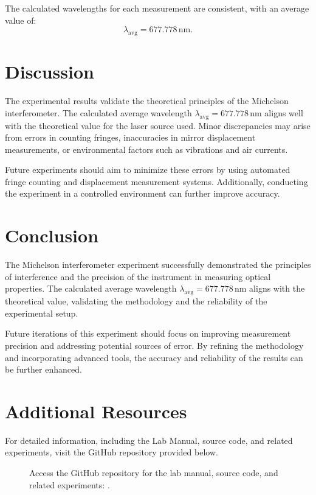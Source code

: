 \documentclass[journal]{IEEEtran}
\begin{document}
The calculated wavelengths for each measurement are consistent, with an average value of:
\begin{equation}
\lambda_{\text{avg}} = 677.778 \, \text{nm}.
\end{equation}

\section{Discussion}
The experimental results validate the theoretical principles of the Michelson interferometer. The calculated average wavelength \( \lambda_{\text{avg}} = 677.778 \, \text{nm} \) aligns well with the theoretical value for the laser source used. Minor discrepancies may arise from errors in counting fringes, inaccuracies in mirror displacement measurements, or environmental factors such as vibrations and air currents.

Future experiments should aim to minimize these errors by using automated fringe counting and displacement measurement systems. Additionally, conducting the experiment in a controlled environment can further improve accuracy.

\section{Conclusion}
The Michelson interferometer experiment successfully demonstrated the principles of interference and the precision of the instrument in measuring optical properties. The calculated average wavelength \( \lambda_{\text{avg}} = 677.778 \, \text{nm} \) aligns with the theoretical value, validating the methodology and the reliability of the experimental setup.

Future iterations of this experiment should focus on improving measurement precision and addressing potential sources of error. By refining the methodology and incorporating advanced tools, the accuracy and reliability of the results can be further enhanced.

\section{Additional Resources}
For detailed information, including the Lab Manual, source code, and related experiments, visit the GitHub repository provided below.

\begin{figure}[H]
    \centering
    \begin{minipage}{0.15\textwidth}
        \centering
    \end{minipage}%
    \begin{minipage}{0.2\textwidth}
        \raggedright
        \caption{Access the GitHub repository for the lab manual, source code, and related experiments: \cite{github}.}
        \label{fig:qr_code}
    \end{minipage}
\end{figure}
\end{document}
